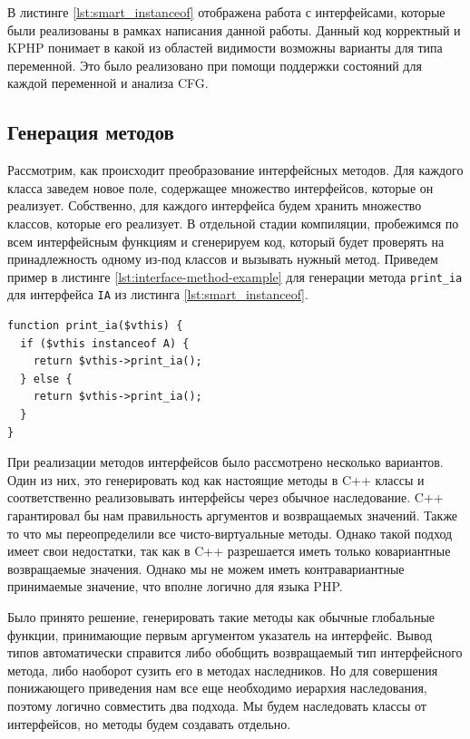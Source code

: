 В листинге \ref{lst:smart_instanceof} отображена работа с интерфейсами, которые были реализованы в рамках написания данной работы.
Данный код корректный и KPHP понимает в какой из областей видимости возможны варианты для типа переменной.
Это было реализовано при помощи поддержки состояний для каждой переменной и анализа CFG.

\subsection{Генерация методов}
Рассмотрим, как происходит преобразование интерфейсных методов.
Для каждого класса заведем новое поле, содержащее множество интерфейсов, которые он реализует.
Собственно, для каждого интерфейса будем хранить множество классов, которые его реализует.
В отдельной стадии компиляции, пробежимся по всем интерфейсным функциям и сгенерируем код, который будет проверять на принадлежность одному из-под классов и вызывать нужный метод.
Приведем пример в листинге \ref{lst:interface-method-example} для генерации метода \verb|print_ia| для интерфейса \verb|IA| из листинга \ref{lst:smart_instanceof}.
\begin{lstlisting}[caption={Пример генерации интерфейсного метода},label={lst:interface-method-example}]
function print_ia($vthis) {
  if ($vthis instanceof A) {
    return $vthis->print_ia();
  } else {
    return $vthis->print_ia();
  }
}
\end{lstlisting}

При реализации методов интерфейсов было рассмотрено несколько вариантов.
Один из них, это генерировать код как настоящие методы в C++ классы и соответственно реализовывать интерфейсы через обычное наследование.
C++ гарантировал бы нам правильность аргументов и возвращаемых значений.
Также то что мы переопределили все чисто-виртуальные методы.
Однако такой подход имеет свои недостатки, так как в C++ разрешается иметь только ковариантные возвращаемые значения.
Однако мы не можем иметь контравариантные принимаемые значение, что вполне логично для языка PHP.

Было принято решение, генерировать такие методы как обычные глобальные функции, принимающие первым аргументом указатель на интерфейс.
Вывод типов автоматически справится либо обобщить возвращаемый тип интерфейсного метода, либо наоборот сузить его в методах наследников.
Но для совершения понижающего приведения нам все еще необходимо иерархия наследования, поэтому логично совместить два подхода.
Мы будем наследовать классы от интерфейсов, но методы будем создавать отдельно.

